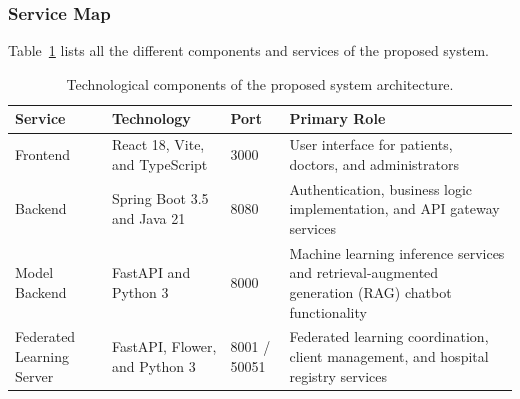 \subsubsection{Service Map}
Table~\ref{tab:system_components} lists all the different components and services of the proposed system.
\begin{table}[htbp]
	\centering
	\caption{Technological components of the proposed system architecture.}
	\label{tab:system_components}
	\begin{tabular}{|p{3.5cm}|p{4.5cm}|p{2cm}|p{5cm}|}
		\hline
		\textbf{Service} & \textbf{Technology} & \textbf{Port} & \textbf{Primary Role} \\
		\hline
		Frontend &
		React 18, Vite, and TypeScript &
		3000 &
		User interface for patients, doctors, and administrators \\
		\hline
		
		Backend &
		Spring Boot 3.5 and Java 21 &
		8080 &
		Authentication, business logic implementation, and API gateway services \\
		\hline
		
		Model Backend &
		FastAPI and Python 3 &
		8000 &
		Machine learning inference services and retrieval-augmented generation (RAG) chatbot functionality \\
		\hline
		
		Federated Learning Server &
		FastAPI, Flower, and Python 3 &
		8001 / 50051 &
		Federated learning coordination, client management, and hospital registry services \\
		\hline
	\end{tabular}
\end{table}

